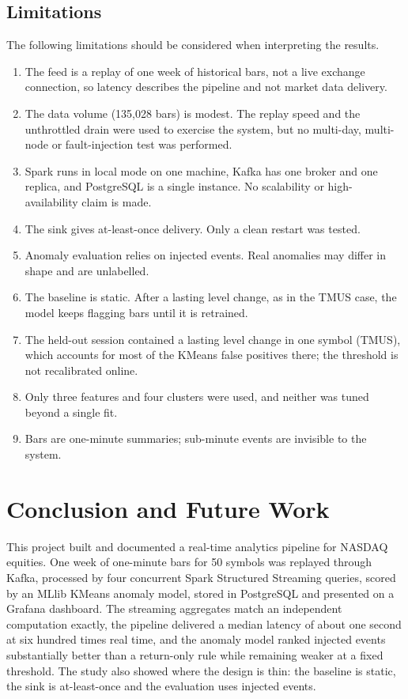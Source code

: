 \documentclass[conference]{IEEEtran}
\begin{document}
\subsection{Limitations}
The following limitations should be considered when interpreting the results.
\begin{enumerate}
\item The feed is a replay of one week of historical bars, not a live exchange connection, so latency describes the pipeline and not market data delivery.
\item The data volume (135,028 bars) is modest. The replay speed and the unthrottled drain were used to exercise the system, but no multi-day, multi-node or fault-injection test was performed.
\item Spark runs in local mode on one machine, Kafka has one broker and one replica, and PostgreSQL is a single instance. No scalability or high-availability claim is made.
\item The sink gives at-least-once delivery. Only a clean restart was tested.
\item Anomaly evaluation relies on injected events. Real anomalies may differ in shape and are unlabelled.
\item The baseline is static. After a lasting level change, as in the TMUS case, the model keeps flagging bars until it is retrained.
\item The held-out session contained a lasting level change in one symbol (TMUS), which accounts for most of the KMeans false positives there; the threshold is not recalibrated online.
\item Only three features and four clusters were used, and neither was tuned beyond a single fit.
\item Bars are one-minute summaries; sub-minute events are invisible to the system.
\end{enumerate}

\section{Conclusion and Future Work}
This project built and documented a real-time analytics pipeline for NASDAQ equities. One week of one-minute bars for 50 symbols was replayed through Kafka, processed by four concurrent Spark Structured Streaming queries, scored by an MLlib KMeans anomaly model, stored in PostgreSQL and presented on a Grafana dashboard. The streaming aggregates match an independent computation exactly, the pipeline delivered a median latency of about one second at six hundred times real time, and the anomaly model ranked injected events substantially better than a return-only rule while remaining weaker at a fixed threshold. The study also showed where the design is thin: the baseline is static, the sink is at-least-once and the evaluation uses injected events.
\end{document}
